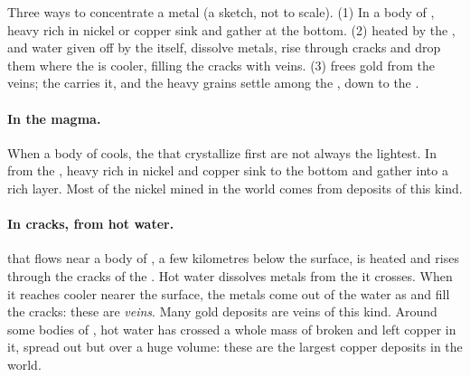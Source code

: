 \begin{omfigure}
{\small Three ways to concentrate a metal (a sketch, not to scale). (1) In
a body of , heavy  rich in nickel or copper sink and gather at
the bottom. (2)  heated by the , and water given off by the
 itself, dissolve metals, rise through cracks and drop them where the
 is cooler, filling the cracks with veins. (3)  frees gold from
the veins; the  carries it, and the heavy grains settle among the
, down to the .}
\label{fig:g9:earth-resources:deposits}
\end{omfigure}

\paragraph{In the magma.} When a body of  cools, the  that
crystallize first are not always the lightest. In  from the ,
heavy  rich in nickel and copper sink to the bottom and gather into
a rich layer. Most of the nickel mined in the world comes from deposits of
this kind.

\paragraph{In cracks, from hot water.}  that flows near a body
of , a few kilometres below the surface, is heated and rises through
the cracks of the . Hot water dissolves metals from the  it
crosses. When it reaches cooler  nearer the surface, the metals come
out of the water as  and fill the cracks: these are
\emph{veins}. Many gold deposits are veins of this kind. Around
some bodies of , hot water has crossed a whole mass of broken 
and left copper in it, spread out but over a huge volume: these are the
largest copper deposits in the world.

